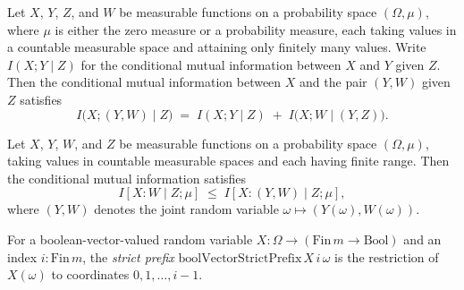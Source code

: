 \begin{theorem}
\label{ProbabilityTheory.condMutualInfo_prod_right_eq_add}
\leanok
{}
Let $X$, $Y$, $Z$, and $W$ be measurable functions on a probability space $(\Omega,
\mu)$, where $\mu$ is either the zero measure or a probability measure, each taking
values in a countable measurable space and attaining only finitely many values. Write
$I(X ; Y \mid Z)$ for the conditional mutual information between $X$ and $Y$ given $Z$.
Then the conditional mutual information between $X$ and the pair $(Y, W)$ given $Z$
satisfies
\[
I\bigl(X ; (Y, W) \mid Z\bigr) \;=\; I(X ; Y \mid Z) \;+\; I\bigl(X ; W \mid (Y,
Z)\bigr).
\]
\end{theorem}

\begin{theorem}
\label{ProbabilityTheory.condMutualInfo_le_prod_right_snd}
\leanok
{}
Let $X$, $Y$, $W$, and $Z$ be measurable functions on a probability space $(\Omega,
\mu)$, taking values in countable measurable spaces and each having finite range. Then
the conditional mutual information satisfies
\[
  I[X : W \mid Z; \mu] \;\le\; I[X : (Y, W) \mid Z; \mu],
\]
where $(Y, W)$ denotes the joint random variable $\omega \mapsto (Y(\omega),
W(\omega))$.
\end{theorem}

\begin{definition}
\label{ProbabilityTheory.boolVectorStrictPrefix}
\leanok
For a boolean-vector-valued random variable $X : \Omega \to (\mathrm{Fin}\,m \to \mathrm{Bool})$
and an index $i : \mathrm{Fin}\,m$, the \emph{strict prefix} $\mathrm{boolVectorStrictPrefix}\,X\,i\,\omega$
is the restriction of $X(\omega)$ to coordinates $0, 1, \ldots, i-1$.
\end{definition}

